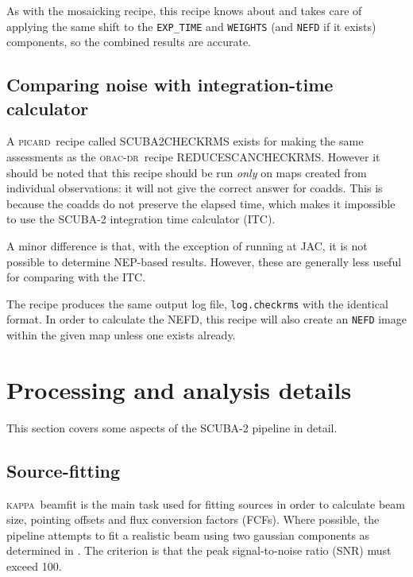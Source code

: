 \documentclass[twoside,11pt]{article}
\newcommand{\xlabel}[1]{}
\renewcommand{\_}{\texttt{\symbol{95}}}
\newcommand{\KAPPA}{\textsc{kappa}}
\newcommand{\oracdr}{\textsc{orac-dr}}
\newcommand{\picard}{\textsc{picard}}
\newcommand{\task}[1]{\textsf{#1}}
\newcommand{\snrmin}{100}
\begin{document}
As with the mosaicking recipe, this recipe knows about and takes care
of applying the same shift to the \verb+EXP_TIME+ and \verb+WEIGHTS+
(and \verb+NEFD+ if it exists) components, so the combined results are
accurate.

\subsection{Comparing noise with integration-time calculator\label{se:checkrms}}

A \picard\ recipe called \task{SCUBA2\_CHECK\_RMS} exists for making
the same assessments as the \oracdr\ recipe
\task{REDUCE\_SCAN\_CHECKRMS}. However it should be noted that this
recipe should be run \textit{only} on maps created from individual
observations: it will not give the correct answer for coadds. This is
because the coadds do not preserve the elapsed time, which makes it
impossible to use the SCUBA-2 integration time calculator (ITC).

A minor difference is that, with the exception of running at JAC, it
is not possible to determine NEP-based results. However, these are
generally less useful for comparing with the ITC.

The recipe produces the same output log file, \texttt{log.checkrms}
with the identical format. In order to calculate the NEFD, this recipe
will also create an \verb+NEFD+ image within the given map unless one
exists already.


\section{\xlabel{procdetails}Processing and analysis details\label{procdetails}}

This section covers some aspects of the SCUBA-2 pipeline in detail.

\subsection{Source-fitting}

\KAPPA\ \task{beamfit} is the main task used for fitting sources in
order to calculate beam size, pointing offsets and flux conversion
factors (FCFs). Where possible, the pipeline attempts to fit a
realistic beam using two gaussian components as determined in
\cite{scuba2calpaper}. The criterion is that the peak signal-to-noise
ratio (SNR) must exceed \snrmin.
\end{document}
